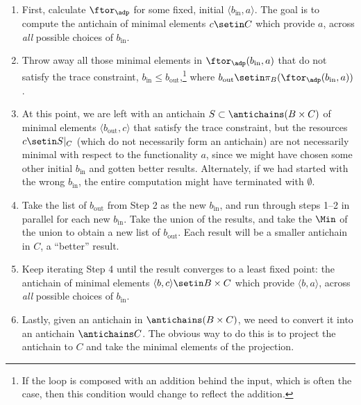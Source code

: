 \begin{enumerate}
    \item First, calculate $\ftor_\adp$ for some fixed, initial $\langle b_{\text{in}},a \rangle$.
          The goal is to compute the antichain of minimal elements $c \setin C$ which provide $a$, across \emph{all} possible choices of $b_{\text{in}}$.
    \item Throw away all those minimal elements in $\ftor_\adp(b_{\text{in}},a)$ that do not satisfy the trace constraint, $b_{\text{in}} \leq b_{\text{out}}$,\footnote{If the loop is composed with an addition behind the input, which is often the case, then this condition would change to reflect the addition.} where $b_{\text{out}} \setin \pi_B(\ftor_\adp(b_{\text{in}},a))$.
    \item At this point, we are left with an antichain $S \subset \antichains (B \times C)$ of minimal elements $\langle b_{\text{out}},c \rangle$ that satisfy the trace constraint, but the resources $c \setin S|_C$ (which do not necessarily form an antichain) are not necessarily minimal with respect to the functionality $a$, since we might have chosen some other initial $b_{\text{in}}$ and gotten better results.
          Alternately, if we had started with the wrong $b_{\text{in}}$, the entire computation might have terminated with $\emptyset$.
    \item Take the list of $b_{\text{out}}$ from Step 2 as the new $b_{\text{in}}$, and run through steps 1--2 in parallel for each new $b_{\text{in}}$.
          Take the union of the results, and take the $\Min$ of the union to obtain a new list of $b_{\text{out}}$.
          Each result will be a smaller antichain in $C$, \ie  a ``better'' result.
    \item Keep iterating Step 4 until the result converges to a least fixed point: the antichain of minimal elements $\langle b, c \rangle \setin B \times C$ which provide $\langle b, a \rangle$, across \emph{all} possible choices of $b_{\text{in}}$.
    \item Lastly, given an antichain in $\antichains (B\times C)$, we need to convert it into an antichain $\antichains C$.
          The obvious way to do this is to project the antichain to $C$ and take the minimal elements of the projection.

\end{enumerate}
